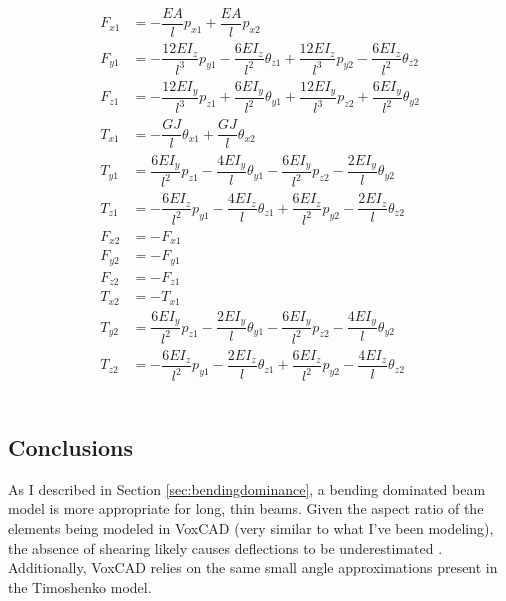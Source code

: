 {\begin{subequations}
\begin{align} 
\label{eq:fx1vox}
F_{x1} &=  -\dfrac{EA}{l}p_{x1} + \dfrac{EA}{l}p_{x2} \\[10pt]
\label{eq:fy1vox}
F_{y1} &=  -\dfrac{12EI_z}{l^3}p_{y1} - \dfrac{6EI_z}{l^2}\theta_{z1} + \dfrac{12EI_z}{l^3}p_{y2} - \dfrac{6EI_z}{l^2}\theta_{z2}\\[10pt]
\label{eq:fz1vox}
F_{z1} &= - \dfrac{12EI_y}{l^3}p_{z1} + \dfrac{6EI_y}{l^2}\theta_{y1} + \dfrac{12EI_y}{l^3}p_{z2} + \dfrac{6EI_y}{l^2}\theta_{y2}\\[10pt]
\label{eq:tx1vox}
T_{x1} &=  -\dfrac{GJ}{l}\theta_{x1} + \dfrac{GJ}{l}\theta_{x2} \\[10pt]
\label{eq:ty1vox}
T_{y1} &= \dfrac{6EI_y}{l^2}p_{z1} - \dfrac{4EI_y}{l}\theta_{y1}  - \dfrac{6EI_y}{l^2}p_{z2} - \dfrac{2EI_y}{l}\theta_{y2} \\[10pt]
\label{eq:tz1vox}
T_{z1} &=  -\dfrac{6EI_z}{l^2}p_{y1} - \dfrac{4EI_z}{l}\theta_{z1}  + \dfrac{6EI_z}{l^2}p_{y2} - \dfrac{2EI_z}{l}\theta_{z2} \\[10pt]
\label{eq:fx2vox}
F_{x2} &=  -F_{x1}\\[10pt]
\label{eq:fy2vox}
F_{y2} &=  -F_{y1}\\[10pt]
\label{eq:fz2vox}
F_{z2} &=  -F_{z1}\\[10pt]
\label{eq:tx2vox}
T_{x2} &=  -T_{x1}\\[10pt]
\label{eq:ty2vox}
T_{y2} &=  \dfrac{6EI_y}{l^2}p_{z1} - \dfrac{2EI_y}{l}\theta_{y1}  - \dfrac{6EI_y}{l^2}p_{z2} - \dfrac{4EI_y}{l}\theta_{y2} \\[10pt]
\label{eq:tz2vox}
T_{z2} &= -\dfrac{6EI_z}{l^2}p_{y1} - \dfrac{2EI_z}{l}\theta_{z1}  + \dfrac{6EI_z}{l^2}p_{y2} - \dfrac{4EI_z}{l}\theta_{z2}
\end{align}
\end{subequations}\\

\subsection{Conclusions}

As I described in Section \ref{sec:bendingdominance}, a bending dominated beam model is more appropriate for long, thin beams.   Given the aspect ratio of the elements being modeled in VoxCAD (very similar to what I've been modeling), the absence of shearing likely causes deflections to be underestimated \cite{Bower2009}.  Additionally, VoxCAD relies on the same small angle approximations present in the Timoshenko model.\\

}
